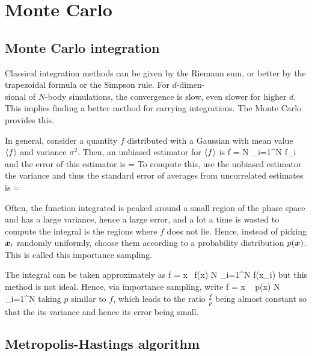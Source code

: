 \chapter{Monte Carlo}
	
	\section{Monte Carlo integration}

		Classical integration methods can be given by the Riemann sum, or better by the trapezoidal formula or the Simpson rule. For $d$-dimen-\\sional of $N$-body simulations, the convergence is slow, even slower for higher $d$. This implies finding a better method for carrying integrations. The Monte Carlo provides this.

		In general, consider a quantity $f$ distributed with a Gaussian with mean value $\ev f$ and variance $\sigma^2$. Then, an unbiased estimator for $\ev f$ is 
		\be \overline f =  N \sum_{i=1}^N f_i \ee
		and the error of this estimator is
		\be \Delta =  \ee
		To compute this, use the unbiased estimator the variance and thus the standard error of averages from uncorrelated estimates is
		\be \Delta =  \ee
		
		Often, the function integrated is peaked around a small region of the phase space and has a large variance, hence a large error, and a lot a time is wasted to compute the integral is the regions where $f$ does not lie. Hence, instead of picking $\vb* x_i$ randomly uniformly, choose them according to a probability distribution $p(\vb* x)$. This is called this importance sampling.

		The integral can be taken approximately as
		\be \ev f =  \Omega \int \dd x \ f(\vb* x)   N \sum_{i=1}^N  f(\vb* x_i) \ee
		but this method is not ideal. Hence, via importance sampling, write
		\be \ev f =  \Omega \int \dd x \  p(\vb* x)   N \sum_{i=1}^N   \ee
		taking $p$ similar to $f$, which leads to the ratio $\frac f p$ being almost constant so that the its variance and hence its error being small.

	\section{Metropolis-Hastings algorithm}

